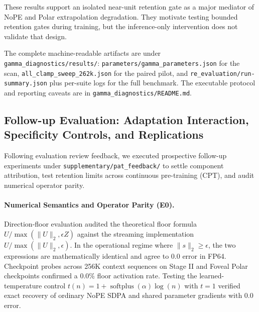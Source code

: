 

These results support an isolated near-unit retention gate as a major mediator of NoPE and Polar extrapolation degradation. They motivate testing bounded retention gates during training, but the inference-only intervention does not validate that design.

The complete machine-readable artifacts are under \texttt{gamma\_diagnostics/results/}: \texttt{parameters/gamma\_parameters.json} for the scan, \texttt{all\_clamp\_sweep\_262k.json} for the paired pilot, and \texttt{re\_evaluation/run-summary.json} plus per-suite logs for the full benchmark. The executable protocol and reporting caveats are in \texttt{gamma\_diagnostics/README.md}.

\subsection{Follow-up Evaluation: Adaptation Interaction, Specificity Controls, and Replications}
\label{appendix:pat_feedback}

Following evaluation review feedback, we executed prospective follow-up experiments under \texttt{supplementary/pat\_feedback/} to settle component attribution, test retention limits across continuous pre-training (CPT), and audit numerical operator parity.

\paragraph{Numerical Semantics and Operator Parity (E0).}
Direction-floor evaluation audited the theoretical floor formula $U / \max(\|U\|_2, \epsilon Z)$ against the streaming implementation $U / \max(\|U\|_2, \epsilon)$. In the operational regime where $\|s\|_2 \ge \epsilon$, the two expressions are mathematically identical and agree to $0.0$ error in FP64. Checkpoint probes across 256K context sequences on Stage II and Foveal Polar checkpoints confirmed a 0.0\% floor activation rate. Testing the learned-temperature control $t(n) = 1 + \operatorname{softplus}(\alpha) \log(n)$ with $t=1$ verified exact recovery of ordinary NoPE SDPA and shared parameter gradients with $0.0$ error.

